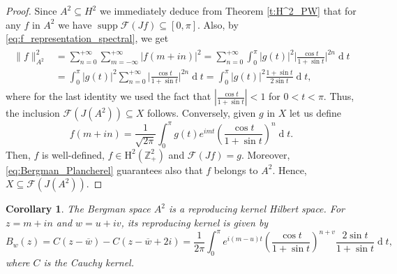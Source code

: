 \documentclass[12pt,a4paper,reqno]{amsart}
\DeclareMathOperator*{\supp}{supp}
\newtheorem{cor}[thm]{Corollary}
\theoremstyle{definition}
\theoremstyle{definition}\newtheorem{defn}[thm]{Definition}
\begin{document}
    \begin{proof}
        Since $A^2\subseteq H^2$ we immediately deduce from Theorem \ref{t:H^2_PW} that for any $f$ in $A^2$ we have $\supp\mathcal F(Jf)\subseteq [0,\pi]$. Also, by \eqref{eq:f_representation_spectral}, we get
        \begin{align}\label{eq:Bergman_Plancherel}
        \begin{split}
              \|f\|^2_{A^2}&=\sum_{n=0}^{+\infty}\sum_{m=-\infty}^{+\infty}|f(m+in)|^2=\sum_{n=0}^{+\infty}\int_0^\pi |g(t)|^2 \Big|\frac{\cos t}{1+\sin t }\Big|^{2n}\operatorname{d}\!t\\
            &=\int_0^\pi |g(t)|^2 \sum_{n=0}^{+\infty} \Big|\frac{\cos t}{1+\sin t }\Big|^{2n}\operatorname{d}\!t=\int_0^\pi |g(t)|^2 \frac{1+\sin t}{2\sin t}\operatorname{d}\!t,
        \end{split}
        \end{align}
        where for the last identity we used the fact that $|\frac{\cos t}{1+\sin t}|<1$ for $0<t<\pi$. Thus, the inclusion $\mathcal F(J(A^2))\subseteq X$ follows. Conversely, given $g$ in $X$ let us define
        \[
        f(m+in)=
    \frac{1}{\sqrt{2\pi}}\int_0^\pi
    g(t)e^{imt}
    \left(\frac{\cos t}{1+\sin t}\right)^n
    \operatorname{d}\!t.
        \]
    Then, $f$ is well-defined,  $f\in \operatorname{H^2(\mathbb Z^2_+)}$  and $\mathcal F(Jf)=g$. Moreover, \eqref{eq:Bergman_Plancherel} guarantees also that $f$ belongs to $A^2$. Hence, $X\subseteq \mathcal F(J(A^2))$.
    \end{proof}
    
    \begin{cor}\label{c:Bergman_kernel}
    The Bergman space $A^2$ is a reproducing kernel Hilbert space. For $z=m+in$ and $w=u+iv$, its reproducing kernel
    is given by
    \[
    B_w(z)=
    C(z-\overline w)-C(z-\overline w+2i)
    =
    \frac{1}{2\pi}
    \int_0^\pi
    e^{i(m-u)t}
    \left(\frac{\cos t}{1+\sin t}\right)^{n+v}
    \frac{2\sin t}{1+\sin t}
    \operatorname{d}\!t,
    \]
    where $C$ is the Cauchy kernel.
    \end{cor}
    
\end{document}

